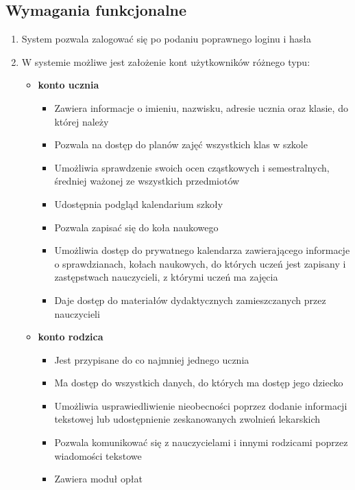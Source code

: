 \documentclass{article}
\begin{document}
\subsection{Wymagania funkcjonalne}
\begin{enumerate}
    \item System pozwala zalogować się po podaniu poprawnego loginu i hasła
    \item W systemie możliwe jest założenie kont użytkowników różnego typu:
    \begin{itemize}
        \item \textbf{konto ucznia}
        \begin{itemize}
            \item Zawiera informacje o imieniu, nazwisku, adresie ucznia oraz klasie, do której należy
            \item Pozwala na dostęp do planów zajęć wszystkich klas w szkole
            \item Umożliwia sprawdzenie swoich ocen cząstkowych i semestralnych, średniej ważonej ze wszystkich przedmiotów
            \item Udostępnia podgląd kalendarium szkoły
            \item Pozwala zapisać się do koła naukowego
            \item Umożliwia dostęp do prywatnego kalendarza zawierającego informacje o sprawdzianach, kołach naukowych, do których uczeń jest zapisany i zastępstwach nauczycieli, z którymi uczeń ma zajęcia
            \item Daje dostęp do materiałów dydaktycznych zamieszczanych przez nauczycieli
        \end{itemize}
        \item \textbf{konto rodzica} 
        \begin{itemize}
            \item Jest przypisane do co najmniej jednego ucznia
            \item Ma dostęp do wszystkich danych, do których ma dostęp jego dziecko
            \item Umożliwia usprawiedliwienie nieobecności poprzez dodanie informacji tekstowej lub udostępnienie zeskanowanych zwolnień lekarskich
            \item Pozwala komunikować się z nauczycielami i innymi rodzicami poprzez wiadomości tekstowe
            \item Zawiera moduł opłat %
        \end{itemize}

\end{itemize}
\end{enumerate}
\end{document}
